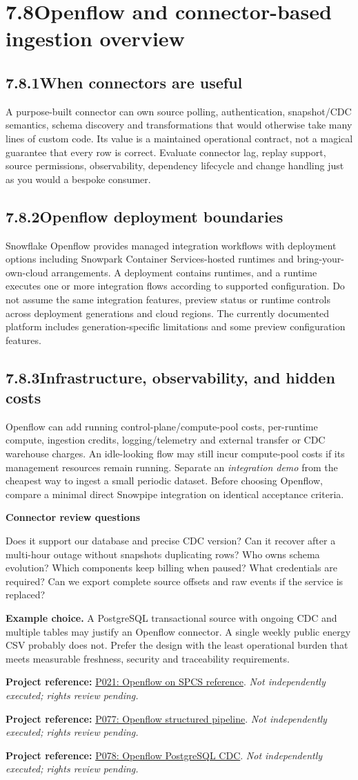 \documentclass[11pt,twoside]{article}
\newcommand{\topic}[2]{\subsection*{#1\quad #2}}
\newcommand{\repo}[2]{\par\begingroup\fontsize{8.0}{9.6}\selectfont\sffamily\color{inkgray}\textbf{Project reference:} \href{#2}{#1}. \textit{Not independently executed; rights review pending.}\par\endgroup}
\begin{document}
\section*{7.8\quad Openflow and connector-based ingestion overview}
\topic{7.8.1}{When connectors are useful}
A purpose-built connector can own source polling, authentication, snapshot/CDC semantics, schema discovery and transformations that would otherwise take many lines of custom code. Its value is a maintained operational contract, not a magical guarantee that every row is correct. Evaluate connector lag, replay support, source permissions, observability, dependency lifecycle and change handling just as you would a bespoke consumer.
\topic{7.8.2}{Openflow deployment boundaries}
Snowflake Openflow provides managed integration workflows with deployment options including Snowpark Container Services-hosted runtimes and bring-your-own-cloud arrangements. A deployment contains runtimes, and a runtime executes one or more integration flows according to supported configuration. Do not assume the same integration features, preview status or runtime controls across deployment generations and cloud regions. The currently documented platform includes generation-specific limitations and some preview configuration features.
\topic{7.8.3}{Infrastructure, observability, and hidden costs}
Openflow can add running control-plane/compute-pool costs, per-runtime compute, ingestion credits, logging/telemetry and external transfer or CDC warehouse charges. An idle-looking flow may still incur compute-pool costs if its management resources remain running. Separate an \emph{integration demo} from the cheapest way to ingest a small periodic dataset. Before choosing Openflow, compare a minimal direct Snowpipe integration on identical acceptance criteria.
\begin{whitebox}\textbf{Connector review questions}\par
Does it support our database and precise CDC version? Can it recover after a multi-hour outage without snapshots duplicating rows? Who owns schema evolution? Which components keep billing when paused? What credentials are required? Can we export complete source offsets and raw events if the service is replaced?\end{whitebox}
\textbf{Example choice.} A PostgreSQL transactional source with ongoing CDC and multiple tables may justify an Openflow connector. A single weekly public energy CSV probably does not. Prefer the design with the least operational burden that meets measurable freshness, security and traceability requirements.
\repo{P021: Openflow on SPCS reference}{https://github.com/Snowflake-Labs/sfguide-getting-started-with-openflow-spcs}
\repo{P077: Openflow structured pipeline}{https://github.com/Snowflake-Labs/openflow-structured-data-pipeline-demo}
\repo{P078: Openflow PostgreSQL CDC}{https://github.com/Snowflake-Labs/sfguide-getting-started-openflow-postgresql-cdc}
\newpage
\end{document}
